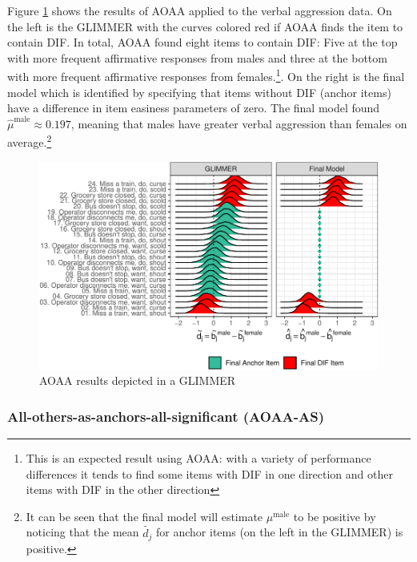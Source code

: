 \documentclass[
  english,
  man,floatsintext]{apa6}
\begin{document}
Figure \ref{fig:aoaa} shows the results of AOAA applied to the verbal aggression data. On the left is the GLIMMER with the curves colored red if AOAA finds the item to contain DIF. In total, AOAA found eight items to contain DIF: Five at the top with more frequent affirmative responses from males and three at the bottom with more frequent affirmative responses from females.\footnote{This is an expected result using AOAA: with a variety of performance differences it tends to find some items with DIF in one direction and other items with DIF in the other direction}. On the right is the final model which is identified by specifying that items without DIF (anchor items) have a difference in item easiness parameters of zero. The final model found \(\hat \mu^\text{male} \approx 0.197\), meaning that males have greater verbal aggression than females on average.\footnote{It can be seen that the final model will estimate \(\mu^\text{male}\) to be positive by noticing that the mean \(\tilde {d_j}\) for anchor items (on the left in the GLIMMER) is positive.}

\begin{figure}[h]

{\centering \includegraphics{paper_apa_files/figure-latex/aoaa-1} 

}

\caption{AOAA results depicted in a GLIMMER}\label{fig:aoaa}
\end{figure}

\hypertarget{all-others-as-anchors-all-significant-aoaa-as}{%
\subsubsection{All-others-as-anchors-all-significant (AOAA-AS)}\label{all-others-as-anchors-all-significant-aoaa-as}}
\end{document}
